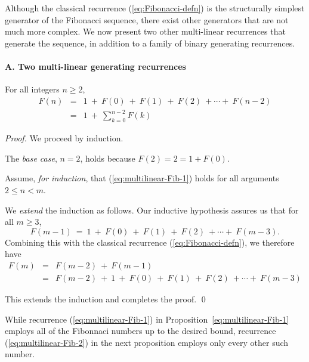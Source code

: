 Although the classical recurrence (\ref{eq:Fibonacci-defn}) is the
structurally simplest generator of the Fibonacci sequence, there exist
other generators that are not much more complex.  We now present two
other multi-linear recurrences that generate the sequence, in addition
to a family of binary generating recurrences.

\paragraph{\small\sf A. Two multi-linear generating recurrences}

\begin{prop}
\label{thm:FiboSum-1}
For all integers $n \geq 2$,
\begin{eqnarray}
\label{eq:multilinear-Fib-1}
F(n) & = &
1 \ + \ F(0) \ + \ F(1) \ + \ F(2) \ + \cdots + \ F(n-2) \\
\nonumber
     & = &
1 \ + \ \sum_{k=0}^{n-2} F(k)
\end{eqnarray}
\end{prop}

\begin{proof}
We proceed by induction.

\noindent
The {\em base case}, $n=2$, holds because $F(2) = 2 =  1 + F(0)$.

\noindent 
 Assume, {\em for induction}, that 
(\ref{eq:multilinear-Fib-1}) holds for all arguments $2 \leq n < m$.

\noindent
We {\em extend} the induction as follows.  Our inductive hypothesis
assures us that for all $m \geq 3$,
\[ F(m-1) \ = \ 1 \ + \ F(0) \ + \ F(1) \ + \ F(2) \ + \cdots + \ F(m-3). \]
Combining this with the classical recurrence
(\ref{eq:Fibonacci-defn}), we therefore have
\begin{eqnarray*}
F(m) & = & F(m-2) \ + \ F(m-1) \\
     & = &
F(m-2) \ + \ 1 \ + \ F(0) \ + \ F(1) \ + \ F(2) \ + \cdots + \ F(m-3)
\end{eqnarray*}

\noindent
This extends the induction and completes the proof.
\qed
\end{proof}

\medskip

While recurrence (\ref{eq:multilinear-Fib-1}) in
Proposition~\ref{eq:multilinear-Fib-1} employs all of the Fibonnaci
numbers up to the desired bound, recurrence
(\ref{eq:multilinear-Fib-2}) in the next proposition employs only
every other such number.

